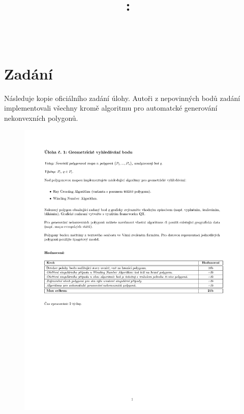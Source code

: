 \documentclass{article}
\title{
\vspace{2in}
\textmd{\textbf{\hmwkClass:\ \hmwkTitle}}\\
\normalsize\vspace{0.1in}\large{\hmwkDueDate}\\
\vspace{3in}
}
\author{\textbf{\hmwkAuthorName}}
\date{} %
\begin{document}
\maketitle



\newpage
\tableofcontents
\newpage



\section{Zadání}
\indent Následuje kopie oficiálního zadání úlohy. Autoři z nepovinných bodů zadání implementovali všechny kromě algoritmu pro automatcké generování nekonvexních polygonů.
\begin{figure}[htbp]
    \centering
        \includegraphics[clip, trim=0cm 11cm 0cm 0cm, width=1.00\textwidth]{zadani.pdf}
\end{figure}
\clearpage
\end{document}
